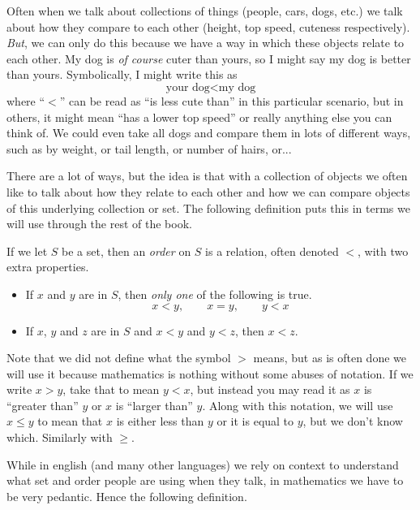 
Often when we talk about collections of things (people, cars, dogs, etc.) we
talk about how they compare to each other (height, top speed, cuteness
respectively). \emph{But}, we can only do this because we have a way in which
these objects relate to each other. My dog is \emph{of course} cuter than
yours, so I might say my dog is better than yours. Symbolically, I might write
this as
\begin{equation*}\label{eq:doges}
    \text{your dog} < \text{my dog}
\end{equation*}
where ``$<$'' can be read as ``is less cute than'' in this particular scenario,
but in others, it might mean ``has a lower top speed'' or really anything else
you can think of. We could even take all dogs and compare them in lots of
different ways, such as by weight, or tail length, or number of hairs, or...

There are a lot of ways, but the idea is that with a collection of objects we
often like to talk about how they relate to each other and how we can compare
objects of this underlying collection or set. The following definition puts
this in terms we will use through the rest of the book.

\begin{definition}\label{def:order}
    If we let $S$ be a set, then an \emph{order} on $S$ is a relation, often
    denoted $<$, with two extra properties.
    \begin{itemize}
        \item If $x$ and $y$ are in $S$, then \emph{only one} of the following
        is true.
        \[ x < y, \qquad x = y, \qquad y < x\]
        \item If $x$, $y$ and $z$ are in $S$ and $x < y$ and $y < z$, then $x <
        z$.
    \end{itemize}
\end{definition}

Note that we did not define what the symbol $>$ means, but as is often done we
will use it because mathematics is nothing without some abuses of notation. If
we write $x > y$, take that to mean $y < x$, but instead you may read it as $x$
is ``greater than'' $y$ or $x$ is ``larger than'' $y$. Along with this
notation, we will use $x \le y$ to mean that $x$ is either less than $y$ or it
is equal to $y$, but we don't know which. Similarly with $\ge$.

While in english (and many other languages) we rely on context to understand
what set and order people are using when they talk, in mathematics we have to
be very pedantic. Hence the following definition.

